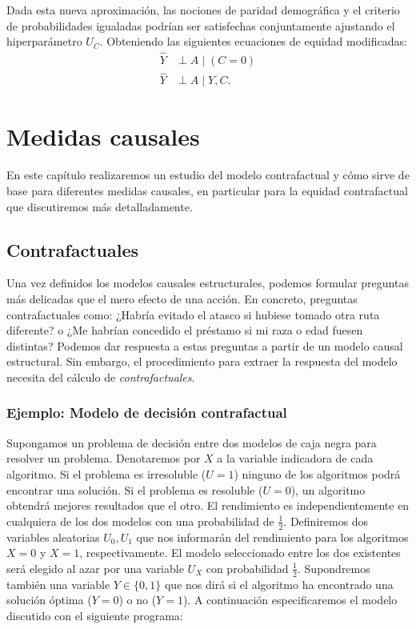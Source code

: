\documentclass[oneside,openright,titlepage,numbers=noenddot,openany,headinclude,footinclude=true,
cleardoublepage=empty,abstractoff,BCOR=5mm,paper=a4,fontsize=12pt,main=spanish]{scrreprt}
\begin{document}
Dada esta nueva aproximación, las nociones de paridad demográfica y el criterio de probabilidades igualadas podrían ser satisfechas conjuntamente ajustando el hiperparámetro $U_C$. Obteniendo las siguientes ecuaciones de equidad modificadas:
\begin{equation*}
    \begin{split}
        \hat{Y} &\perp A \mid (C=0)\\
        \hat{Y} &\perp A \mid Y,C.
    \end{split}
\end{equation*}

\chapter{Medidas causales} \label{ch:medidascausal}

En este capítulo realizaremos un estudio del modelo contrafactual y cómo sirve de base para diferentes medidas causales, en particular para la equidad contrafactual que discutiremos más detalladamente. 

\section{Contrafactuales}

Una vez definidos los modelos causales estructurales, podemos formular preguntas más delicadas que el mero efecto de una acción. En concreto, preguntas contrafactuales como: ¿Habría evitado el atasco si hubiese tomado otra ruta diferente? o ¿Me habrían concedido el préstamo si mi raza o edad fuesen distintas? Podemos dar respuesta a estas preguntas a partir de un modelo causal estructural. Sin embargo, el procedimiento para extraer la respuesta del modelo necesita del cálculo de \textit{contrafactuales}.

\subsection{Ejemplo: Modelo de decisión contrafactual}

Supongamos un problema de decisión entre dos modelos de caja negra para resolver un problema. Denotaremos por $X$ a la variable indicadora de cada algoritmo. Si el problema es irresoluble ($U=1$) ninguno de los algoritmos podrá encontrar una solución. Si el problema es resoluble ($U=0$), un algoritmo obtendrá mejores resultados que el otro. El rendimiento es independientemente en cualquiera de los dos modelos con una probabilidad de $\frac{1}{2}$. Definiremos dos variables aleatorias $U_0, U_1$ que nos informarán del rendimiento para los algoritmos $X=0$ y $X=1$, respectivamente. El modelo seleccionado entre los dos existentes será elegido al azar por una variable $U_X$ con probabilidad $\frac{1}{2}$. Supondremos también una variable $Y \in \{0,1\}$ que nos dirá si el algoritmo ha encontrado una solución óptima ($Y=0$) o no ($Y=1$). A continuación especificaremos el modelo discutido con el siguiente programa:
\end{document}
